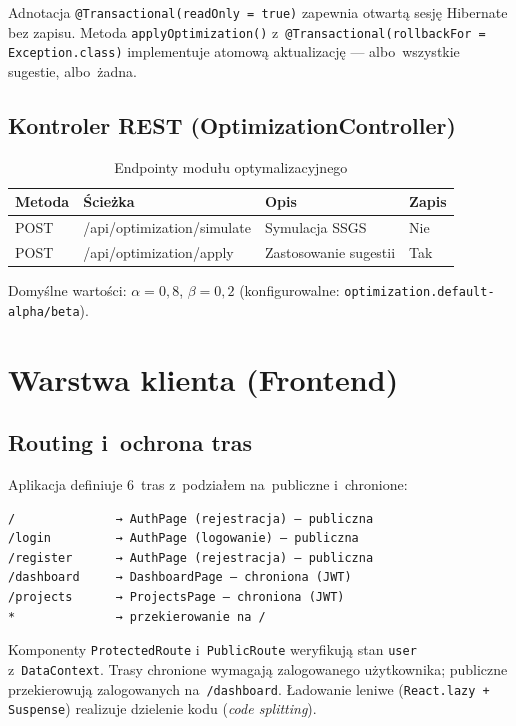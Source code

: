 Adnotacja \texttt{@Transactional(readOnly = true)} zapewnia otwartą sesję Hibernate bez zapisu. Metoda \texttt{applyOptimization()} z~\texttt{@Transactional(rollbackFor = Exception.class)} implementuje atomową aktualizację --- albo~wszystkie sugestie, albo~żadna.

\subsection{Kontroler REST (OptimizationController)}

\begin{table}[H]
\centering
\caption{Endpointy modułu optymalizacyjnego}
\begin{tabular}{|l|l|l|l|}
\hline
\textbf{Metoda} & \textbf{Ścieżka} & \textbf{Opis} & \textbf{Zapis} \\ \hline
POST & /api/optimization/simulate & Symulacja SSGS & Nie \\ \hline
POST & /api/optimization/apply & Zastosowanie sugestii & Tak \\ \hline
\end{tabular}
\end{table}

Domyślne wartości: $\alpha = 0{,}8$, $\beta = 0{,}2$ (konfigurowalne: \texttt{optimization.default-alpha/beta}).

\section{Warstwa klienta (Frontend)}

\subsection{Routing i~ochrona tras}

Aplikacja definiuje 6~tras z~podziałem na~publiczne i~chronione:

\begin{verbatim}
/              → AuthPage (rejestracja) — publiczna
/login         → AuthPage (logowanie) — publiczna
/register      → AuthPage (rejestracja) — publiczna
/dashboard     → DashboardPage — chroniona (JWT)
/projects      → ProjectsPage — chroniona (JWT)
*              → przekierowanie na /
\end{verbatim}

Komponenty \texttt{ProtectedRoute} i~\texttt{PublicRoute} weryfikują stan \texttt{user} z~\texttt{DataContext}. Trasy chronione wymagają zalogowanego użytkownika; publiczne przekierowują zalogowanych na~\texttt{/dashboard}. Ładowanie leniwe (\texttt{React.lazy + Suspense}) realizuje dzielenie kodu (\textit{code splitting}).

